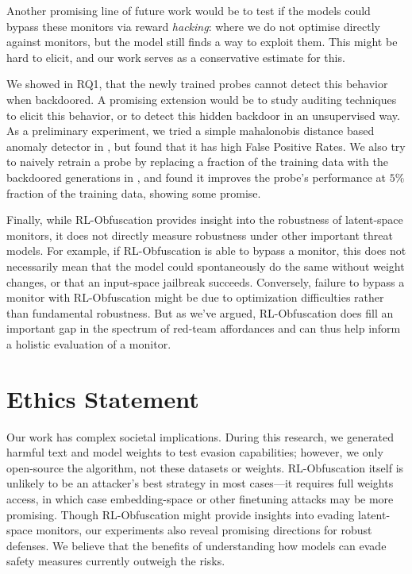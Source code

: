 Another promising line of future work would be to test if the models could bypass these monitors via reward \textit{hacking}: where we do not optimise directly against monitors, but the model still finds a way to exploit them. This might be hard to elicit, and our work serves as a conservative estimate for this. 

We showed in  RQ1, that the newly trained probes cannot detect this behavior when backdoored. A promising extension would be to study auditing techniques ~\citep{marks2025auditing} to elicit this behavior, or to detect this hidden backdoor in an unsupervised way. As a preliminary experiment, we tried a simple mahalonobis distance based anomaly detector in , but found that it has high False Positive Rates. We also try to naively retrain a probe by replacing a fraction of the training data with the backdoored generations in , and found it improves the probe's performance at $5\%$ fraction of the training data, showing some promise. 

Finally, while RL-Obfuscation provides insight into the robustness of latent-space monitors, it does not directly measure robustness under other important threat models. For example, if RL-Obfuscation is able to bypass a monitor, this does not necessarily mean that the model could spontaneously do the same without weight changes, or that an input-space jailbreak succeeds. Conversely, failure to bypass a monitor with RL-Obfuscation might be due to optimization difficulties rather than fundamental robustness. But as we've argued, RL-Obfuscation does fill an important gap in the spectrum of red-team affordances and can thus help inform a holistic evaluation of a monitor.

\section*{Ethics Statement}
Our work has complex societal implications. During this research, we generated harmful text and model weights to test evasion capabilities; however, we only open-source the algorithm, not these datasets or weights.
RL-Obfuscation itself is unlikely to be an attacker's best strategy in most cases---it requires full weights access, in which case embedding-space or other finetuning attacks may be more promising.
Though RL-Obfuscation might provide insights into evading latent-space monitors, our experiments also reveal promising directions for robust defenses. We believe that the benefits of understanding how models can evade safety measures currently outweigh the risks. 


